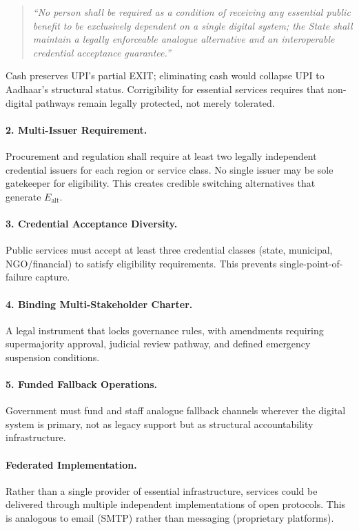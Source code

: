 \documentclass{article}
\begin{document}
\begin{quote}
\textit{``No person shall be required as a condition of receiving any essential public benefit to be exclusively dependent on a single digital system; the State shall maintain a legally enforceable analogue alternative and an interoperable credential acceptance guarantee.''}
\end{quote}

Cash preserves UPI's partial EXIT; eliminating cash would collapse UPI to Aadhaar's structural status. Corrigibility for essential services requires that non-digital pathways remain legally protected, not merely tolerated.

\paragraph{2. Multi-Issuer Requirement.} Procurement and regulation shall require at least two legally independent credential issuers for each region or service class. No single issuer may be sole gatekeeper for eligibility. This creates credible switching alternatives that generate $E_{\text{alt}}$.

\paragraph{3. Credential Acceptance Diversity.} Public services must accept at least three credential classes (state, municipal, NGO/financial) to satisfy eligibility requirements. This prevents single-point-of-failure capture.

\paragraph{4. Binding Multi-Stakeholder Charter.} A legal instrument that locks governance rules, with amendments requiring supermajority approval, judicial review pathway, and defined emergency suspension conditions.

\paragraph{5. Funded Fallback Operations.} Government must fund and staff analogue fallback channels wherever the digital system is primary, not as legacy support but as structural accountability infrastructure.

\paragraph{Federated Implementation.} Rather than a single provider of essential infrastructure, services could be delivered through multiple independent implementations of open protocols. This is analogous to email (SMTP) rather than messaging (proprietary platforms).
\end{document}
